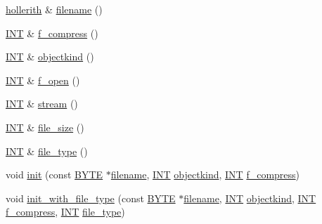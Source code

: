\begin{DoxyCompactItemize}
\item 
\mbox{\hyperlink{classhollerith}{hollerith}} \& \mbox{\hyperlink{classdatabase_a0d239d767658aca51abbea00148b8b2f}{filename}} ()
\item 
\mbox{\hyperlink{galois_8h_a09fddde158a3a20bd2dcadb609de11dc}{I\+NT}} \& \mbox{\hyperlink{classdatabase_aa28ebaac42b9a71e1bc213781012d1c8}{f\+\_\+compress}} ()
\item 
\mbox{\hyperlink{galois_8h_a09fddde158a3a20bd2dcadb609de11dc}{I\+NT}} \& \mbox{\hyperlink{classdatabase_a5b9b82f6cd851fb8826ed68085233c2d}{objectkind}} ()
\item 
\mbox{\hyperlink{galois_8h_a09fddde158a3a20bd2dcadb609de11dc}{I\+NT}} \& \mbox{\hyperlink{classdatabase_a2cac52c70b09d1a6771bddab2220b3e7}{f\+\_\+open}} ()
\item 
\mbox{\hyperlink{galois_8h_a09fddde158a3a20bd2dcadb609de11dc}{I\+NT}} \& \mbox{\hyperlink{classdatabase_a8b91f87e7cd92b8207cbc48edde9d69e}{stream}} ()
\item 
\mbox{\hyperlink{galois_8h_a09fddde158a3a20bd2dcadb609de11dc}{I\+NT}} \& \mbox{\hyperlink{classdatabase_a8547ac1fa93cdcd8ec464cac1ec24c5d}{file\+\_\+size}} ()
\item 
\mbox{\hyperlink{galois_8h_a09fddde158a3a20bd2dcadb609de11dc}{I\+NT}} \& \mbox{\hyperlink{classdatabase_a9dce80d625548b03b8317641b674cd9b}{file\+\_\+type}} ()
\item 
void \mbox{\hyperlink{classdatabase_abae7da96fe55d9f7ca44473b06a1e113}{init}} (const \mbox{\hyperlink{galois_8h_ab6cc7b4aeb6ea31aba2b3fbfc83ff5e6}{B\+Y\+TE}} $\ast$\mbox{\hyperlink{classdatabase_a0d239d767658aca51abbea00148b8b2f}{filename}}, \mbox{\hyperlink{galois_8h_a09fddde158a3a20bd2dcadb609de11dc}{I\+NT}} \mbox{\hyperlink{classdatabase_a5b9b82f6cd851fb8826ed68085233c2d}{objectkind}}, \mbox{\hyperlink{galois_8h_a09fddde158a3a20bd2dcadb609de11dc}{I\+NT}} \mbox{\hyperlink{classdatabase_aa28ebaac42b9a71e1bc213781012d1c8}{f\+\_\+compress}})
\item 
void \mbox{\hyperlink{classdatabase_a3b7a27f69a64812a6bfd765158d62476}{init\+\_\+with\+\_\+file\+\_\+type}} (const \mbox{\hyperlink{galois_8h_ab6cc7b4aeb6ea31aba2b3fbfc83ff5e6}{B\+Y\+TE}} $\ast$\mbox{\hyperlink{classdatabase_a0d239d767658aca51abbea00148b8b2f}{filename}}, \mbox{\hyperlink{galois_8h_a09fddde158a3a20bd2dcadb609de11dc}{I\+NT}} \mbox{\hyperlink{classdatabase_a5b9b82f6cd851fb8826ed68085233c2d}{objectkind}}, \mbox{\hyperlink{galois_8h_a09fddde158a3a20bd2dcadb609de11dc}{I\+NT}} \mbox{\hyperlink{classdatabase_aa28ebaac42b9a71e1bc213781012d1c8}{f\+\_\+compress}}, \mbox{\hyperlink{galois_8h_a09fddde158a3a20bd2dcadb609de11dc}{I\+NT}} \mbox{\hyperlink{classdatabase_a9dce80d625548b03b8317641b674cd9b}{file\+\_\+type}})

\end{DoxyCompactItemize}
